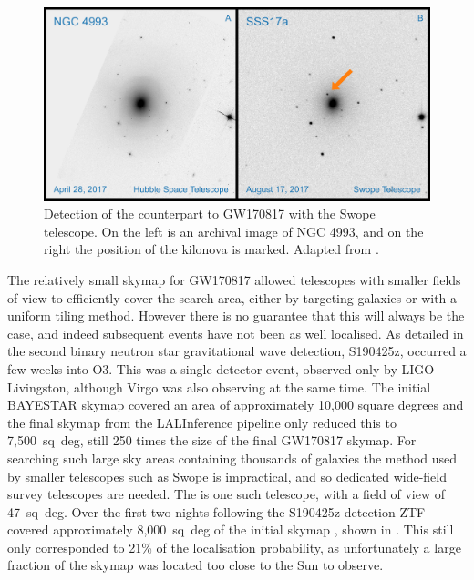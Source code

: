 \begin{colsection}
\begin{colsection}
\begin{figure}[t]
    \begin{center}
        \includegraphics[width=\linewidth]{images/sss17a.pdf}
    \end{center}
    \caption[Detection of the counterpart to GW170817]{
        Detection of the counterpart to GW170817 with the Swope telescope. On the left is an archival image of NGC 4993, and on the right the position of the kilonova is marked. Adapted from \citet{GW170817_Swope}.
        }\label{fig:sss17a}
\end{figure}

The relatively small skymap for GW170817 allowed telescopes with smaller fields of view to efficiently cover the search area, either by targeting galaxies or with a uniform tiling method. However there is no guarantee that this will always be the case, and indeed subsequent events have not been as well localised. As detailed in  the second binary neutron star gravitational wave detection, S190425z, occurred a few weeks into O3. This was a single-detector event, observed only by LIGO-Livingston, although Virgo was also observing at the same time. The initial BAYESTAR skymap covered an area of approximately 10,000 square degrees and the final skymap from the LALInference pipeline only reduced this to 7,500~sq~deg, still 250 times the size of the final GW170817 skymap. For searching such large sky areas containing thousands of galaxies the method used by smaller telescopes such as Swope is impractical, and so dedicated wide-field survey telescopes are needed. The  is one such telescope, with a field of view of 47~sq~deg. Over the first two nights following the S190425z detection ZTF covered approximately 8,000~sq~deg of the initial skymap \citep{GW190425_ZTF}, shown in . This still only corresponded to 21\% of the localisation probability, as unfortunately a large fraction of the skymap was located too close to the Sun to observe.


\end{colsection}
\end{colsection}
